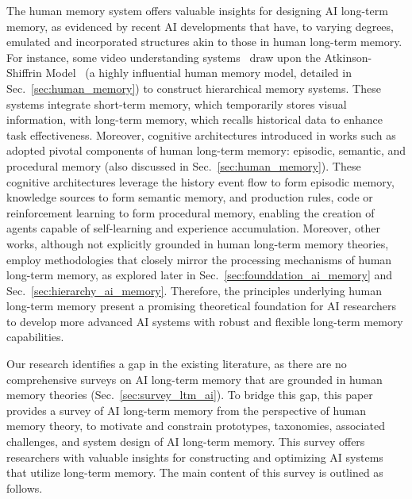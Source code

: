 \documentclass[journal,hideappendix]{vgtc}
\begin{document}
The human memory system offers valuable insights for designing AI long-term memory, as evidenced by recent AI developments that have, to varying degrees, emulated and incorporated structures akin to those in human long-term memory. For instance, some video understanding systems~\cite{cheng2022xmem,song2023moviechat} draw upon the Atkinson-Shiffrin Model~\cite{atkinson1968human} (a highly influential human memory model, detailed in Sec.~\ref{sec:human_memory}) to construct hierarchical memory systems. 
These systems integrate short-term memory, which temporarily stores visual information, with long-term memory, which recalls historical data to enhance task effectiveness. 
Moreover, cognitive architectures introduced in works such as ~\cite{laird2008extending,sumers2023cognitive} adopted pivotal components of human long-term memory: episodic, semantic, and procedural memory (also discussed in Sec.~\ref{sec:human_memory}). These cognitive architectures leverage the history event flow to form episodic memory, knowledge sources to form semantic memory, and production rules, code or reinforcement learning to form procedural memory, enabling the creation of agents capable of self-learning and experience accumulation.
Moreover, other works, although not explicitly grounded in human long-term memory theories, employ methodologies that closely mirror the processing mechanisms of human long-term memory, as explored later in Sec.~\ref{sec:founddation_ai_memory} and Sec.~\ref{sec:hierarchy_ai_memory}. 
Therefore, the principles underlying human long-term memory present a promising theoretical foundation for AI researchers to develop more advanced AI systems with robust and flexible long-term memory capabilities.

Our research identifies a gap in the existing literature, as there are no comprehensive surveys on AI long-term memory that are grounded in human memory theories (Sec.~\ref{sec:survey_ltm_ai}).
To bridge this gap, this paper provides a survey of AI long-term memory from the perspective of human memory theory, to motivate and constrain prototypes, taxonomies, associated challenges, and system design of AI long-term memory. 
This survey offers researchers with valuable insights for constructing and optimizing AI systems that utilize long-term memory.
The main content of this survey is outlined as follows.
\end{document}
